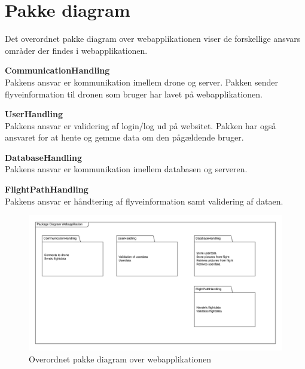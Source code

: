 \section{Pakke diagram}

Det overordnet pakke diagram over webapplikationen viser de forskellige ansvars områder der findes i webapplikationen. 

\textbf{CommunicationHandling}\\
Pakkens ansvar er kommunikation imellem drone og server. Pakken sender flyveinformation til dronen som bruger har lavet på webapplikationen.

\textbf{UserHandling}\\
Pakkens ansvar er validering af login/log ud på websitet. Pakken har også ansvaret for at hente og gemme data om den pågældende bruger.

\textbf{DatabaseHandling}\\
Pakkens ansvar er kommunikation imellem databasen og serveren. 

\textbf{FlightPathHandling}\\
Pakkens ansvar er håndtering af flyveinformation samt validering af dataen.

\vspace{-5pt}
\begin{figure}[H]
	\centering
	\includegraphics[width=1\textwidth]{Billeder/pakke_diagrammer/package_diagram.png}
	\vspace{-5pt}
	\caption{Overordnet pakke diagram over webapplikationen}
	\label{fig:pakke_diagram}
\end{figure}
